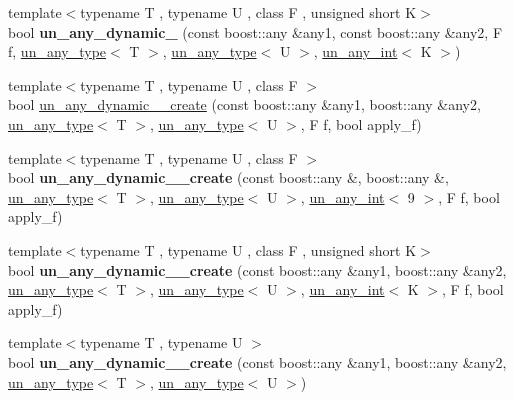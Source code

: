 \begin{DoxyCompactItemize}
\item 
{\footnotesize template$<$typename T , typename U , class F , unsigned short K$>$ }\\bool {\bfseries un\+\_\+any\+\_\+dynamic\+\_} (const boost\+::any \&any1, const boost\+::any \&any2, F f, \mbox{\hyperlink{struct_s_m_spp__di__unipi__it_1_1un__any__type}{un\+\_\+any\+\_\+type}}$<$ T $>$, \mbox{\hyperlink{struct_s_m_spp__di__unipi__it_1_1un__any__type}{un\+\_\+any\+\_\+type}}$<$ U $>$, \mbox{\hyperlink{struct_s_m_spp__di__unipi__it_1_1un__any__int}{un\+\_\+any\+\_\+int}}$<$ K $>$)
\item 
{\footnotesize template$<$typename T , typename U , class F $>$ }\\bool \mbox{\hyperlink{group__boost__any__stuff_ga3a3356c9acf06be5d03879fed1d4b920}{un\+\_\+any\+\_\+dynamic\+\_\+\_\+create}} (const boost\+::any \&any1, boost\+::any \&any2, \mbox{\hyperlink{struct_s_m_spp__di__unipi__it_1_1un__any__type}{un\+\_\+any\+\_\+type}}$<$ T $>$, \mbox{\hyperlink{struct_s_m_spp__di__unipi__it_1_1un__any__type}{un\+\_\+any\+\_\+type}}$<$ U $>$, F f, bool apply\+\_\+f)
\item 
{\footnotesize template$<$typename T , typename U , class F $>$ }\\bool {\bfseries un\+\_\+any\+\_\+dynamic\+\_\+\_\+create} (const boost\+::any \&, boost\+::any \&, \mbox{\hyperlink{struct_s_m_spp__di__unipi__it_1_1un__any__type}{un\+\_\+any\+\_\+type}}$<$ T $>$, \mbox{\hyperlink{struct_s_m_spp__di__unipi__it_1_1un__any__type}{un\+\_\+any\+\_\+type}}$<$ U $>$, \mbox{\hyperlink{struct_s_m_spp__di__unipi__it_1_1un__any__int}{un\+\_\+any\+\_\+int}}$<$ 9 $>$, F f, bool apply\+\_\+f)
\item 
{\footnotesize template$<$typename T , typename U , class F , unsigned short K$>$ }\\bool {\bfseries un\+\_\+any\+\_\+dynamic\+\_\+\_\+create} (const boost\+::any \&any1, boost\+::any \&any2, \mbox{\hyperlink{struct_s_m_spp__di__unipi__it_1_1un__any__type}{un\+\_\+any\+\_\+type}}$<$ T $>$, \mbox{\hyperlink{struct_s_m_spp__di__unipi__it_1_1un__any__type}{un\+\_\+any\+\_\+type}}$<$ U $>$, \mbox{\hyperlink{struct_s_m_spp__di__unipi__it_1_1un__any__int}{un\+\_\+any\+\_\+int}}$<$ K $>$, F f, bool apply\+\_\+f)
\item 
{\footnotesize template$<$typename T , typename U $>$ }\\bool {\bfseries un\+\_\+any\+\_\+dynamic\+\_\+\_\+create} (const boost\+::any \&any1, boost\+::any \&any2, \mbox{\hyperlink{struct_s_m_spp__di__unipi__it_1_1un__any__type}{un\+\_\+any\+\_\+type}}$<$ T $>$, \mbox{\hyperlink{struct_s_m_spp__di__unipi__it_1_1un__any__type}{un\+\_\+any\+\_\+type}}$<$ U $>$)

\end{DoxyCompactItemize}
